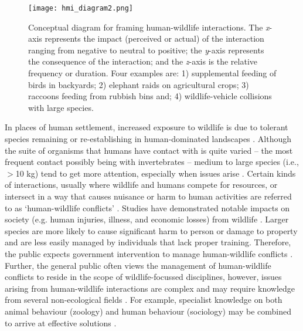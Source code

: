 \begin{figure*}[!t]
  \centering
  \texttt{[image: hmi\_diagram2.png]}
  \caption[Conceptual diagram for framing human-wildlife interactions]{Conceptual diagram for framing human-wildlife interactions. The \textit{x}-axis represents the impact (perceived or actual) of the interaction ranging from negative to neutral to positive; the \textit{y}-axis represents the consequence of the interaction; and the \textit{z}-axis is the relative frequency or duration. Four examples are: 1) supplemental feeding of birds in backyards; 2) elephant raids on agricultural crops; 3) raccoons feeding from rubbish bins and; 4) wildlife-vehicle collisions with large species.}
  \label{hmi_diagram}
\end{figure*}

In places of human settlement, increased exposure to wildlife is due to tolerant species remaining or re-establishing in human-dominated landscapes \citep{soul16}. Although the suite of organisms that humans have contact with is quite varied -- the most frequent contact possibly being with invertebrates -- medium to large species (i.e., $>$10 kg) tend to get more attention, especially when issues arise \citep{seor16}. Certain kinds of interactions, usually where wildlife and humans compete for resources, or intersect in a way that causes nuisance or harm to human activities are referred to as `human-wildlife conflicts' \citep[but see][]{pete10}. Studies have demonstrated notable impacts on society (e.g. human injuries, illness, and economic losses) from wildlife \citep{cono95}. Larger species are more likely to cause significant harm to person or damage to property \citep{cono01} and are less easily managed by individuals that lack proper training. Therefore, the public expects government intervention to manage human-wildlife conflicts \citep{reit99}. Further, the general public often views the management of human-wildlife conflicts to reside in the scope of wildlife-focussed disciplines, however, issues arising from human-wildlife interactions are complex and may require knowledge from several non-ecological fields \citep{deck97,madd04}. For example, specialist knowledge on both animal behaviour (zoology) and human behaviour (sociology) may be combined to arrive at effective solutions \citep{dicka10}.


